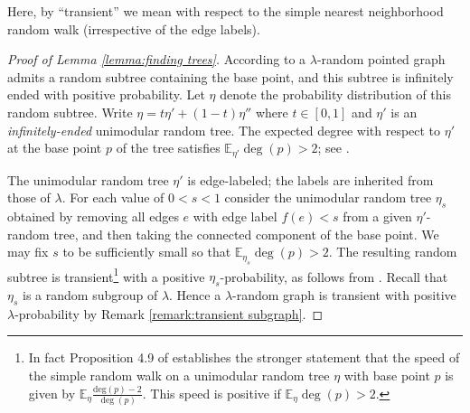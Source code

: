 \documentclass{amsart}
\newcommand{\EE}{\mathbb{E}}
\theoremstyle{plain}
\numberwithin{equation}{section}
\theoremstyle{definition}
\begin{document}
Here, by \enquote{transient} we mean with respect to the simple nearest neighborhood random walk (irrespective of the edge labels).

\begin{proof}[Proof of Lemma \ref{lemma:finding trees}]
According to \cite[Lemma 7.7]{lyons2017probability} a $\lambda$-random pointed graph admits a random subtree containing the base point, and this subtree is infinitely ended with positive probability. Let $\eta$ denote the probability distribution of this random subtree. Write $\eta = t \eta' + (1-t) \eta''$ where $ t \in \left[0,1\right]$ and $\eta'$ is an \emph{infinitely-ended} unimodular random tree. The expected degree with respect to $\eta'$ at the base point $p$ of the tree satisfies $\EE_{\eta'} \deg(p) > 2$; see \cite[Theorems 6.1 and 6.2]{aldous2007processes}.  

The unimodular random tree $\eta'$ is edge-labeled; the labels are inherited from those of $\lambda$.
For each value of $0 < s < 1$  consider the unimodular random tree $\eta_s$ obtained by removing all edges $e$ with edge label $f(e) < s$ from a given $\eta'$-random tree, and then taking the connected component of the base point. We may fix $s$ to be sufficiently small so that $\EE_{\eta_s} \deg(p) >2$. The resulting random subtree is transient\footnote{In fact Proposition 4.9 of \cite{aldous2007processes} establishes the stronger statement that the speed of the simple random walk on a unimodular random tree $\eta$ with base point $p$ is given by $\mathbb{E}_{\eta} \frac{\mathrm{deg}(p)-2}{\deg (p)}$. This speed is positive if $\mathbb{E}_{\eta} \deg (p) > 2$.} with a positive $\eta_s$-probability, as follows from \cite[Proposition 4.9]{aldous2007processes}. Recall that $\eta_s$ is a random subgroup of $\lambda$. Hence a $\lambda$-random graph is transient with positive $\lambda$-probability by Remark \ref{remark:transient subgraph}.
\end{proof}


\end{document}
